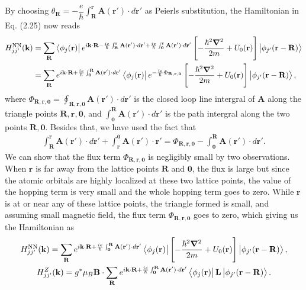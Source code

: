 \documentclass{report}
\newcommand{\f}[2]{\dfrac{#1}{#2}}
\begin{document}
By choosing $\theta_{\mathbf{R}} = - \f{e}{\hbar} \int_{\mathbf{R}}^{\mathbf{r}} \mathbf{A(\mathbf{r'})} \cdot d\mathbf{r'}$ as Peierls substitution, the Hamiltonian in Eq. (2.25) now reads
\begin{equation}
	\begin{aligned}
		H_{jj'}^{\text{NN}}(\mathbf{k})
		 & = \sum_{\mathbf{R}} \bra{\phi_{j}(\mathbf{r})} e^{i\mathbf{k \cdot R} - \frac{ie}{\hbar} \int_{\mathbf{R}}^{\mathbf{r}} \mathbf{A}(\mathbf{r'}) \cdot d\mathbf{r'} + \frac{ie}{\hbar}\int_{\mathbf{0}}^{\mathbf{r}}\mathbf{A(\mathbf{r'})}\cdot d\mathbf{r'} } \left[- \f{\hbar^{2} \boldsymbol{\nabla}^{2}}{2m} + U_{0} (\mathbf{r}) \right] \ket{\phi_{j'}(\mathbf{r - R})} \nonumber \\
		 & = \sum_{\mathbf{R}}  e^{i\mathbf{k \cdot R} + \frac{ie}{\hbar} \int_{\mathbf{0}}^{\mathbf{R}} \mathbf{A(\mathbf{r'})} \cdot d \mathbf{r'} } \bra{\phi_{j}(\mathbf{r})} e^{-\frac{ie}{\hbar} \Phi_{\mathbf{R,r,0}}} \left[ -\f{\hbar^{2} \boldsymbol{\nabla}^{2}}{2m} + U_{0} (\mathbf{r}) \right] \ket{\phi_{j'}(\mathbf{r - R})},
	\end{aligned}
\end{equation}
where $\Phi_{\mathbf{R,r,0}} = \oint_{\mathbf{R,r,0}} \mathbf{A(\mathbf{r'})} \cdot d\mathbf{r'} $ is the closed loop line intergral of $\mathbf{A}$ along the triangle points $\mathbf{R,r,0}$, and $\int_{\mathbf{0}}^{\mathbf{R}} \mathbf{A(\mathbf{r'})} \cdot d \mathbf{r'}$ is the path intergral along the two points $\mathbf{R,0}$. Besides that, we have used the fact that
\begin{align}
	\int_{\mathbf{R}}^{\mathbf{r}} \mathbf{A(\mathbf{r'})} \cdot d\mathbf{r'} + \int_{\mathbf{r}}^{\mathbf{0}} \mathbf{A(r')} \cdot \mathbf{r'} = \Phi_{\mathbf{R,r,0}} - \int_{\mathbf{0}}^{\mathbf{R}} \mathbf{A(\mathbf{r'})} \cdot d \mathbf{r'}.
\end{align}
We can show that the flux term $\Phi_{\mathbf{R,r,0}}$ is negligibly small \cite{yalcin_2019} by two observations. When $\mathbf{r}$ is far away from the lattice points $\mathbf{R}$ and $\mathbf{0}$, the flux is large but since the atomic orbitals are highly localized at these two lattice points, the value of the hopping term is very small and the whole hopping term goes to zero. While $\mathbf{r}$ is at or near any of these lattice points, the triangle formed is small, and assuming small magnetic field, the flux term $\Phi_{\mathbf{R,r,0}}$ goes to zero, which giving us the Hamiltonian as
\begin{gather}
	H_{jj'}^{\text{NN}}(\mathbf{k})
	= \sum_{\mathbf{R}} e^{i\mathbf{k \cdot R} + \frac{ie}{\hbar} \int_{\mathbf{0}}^{\mathbf{R}} \mathbf{A(\mathbf{r'})} \cdot d \mathbf{r'} } \bra{\phi_{j}(\mathbf{r})} \left[ -\f{\hbar^{2} \boldsymbol{\nabla}^{2}}{2m} + U_{0} (\mathbf{r}) \right] \ket{\phi_{j'}(\mathbf{r - R})},\\
	H_{jj'}^{Z}(\mathbf{k})
	= g^{*} \mu_{B} \mathbf{B} \cdot \sum_{\mathbf{R}} e^{i\mathbf{k \cdot R} + \frac{ie}{\hbar} \int_{\mathbf{0}}^{\mathbf{R}} \mathbf{A(\mathbf{r'})} \cdot d\mathbf{r'} } \bra{\phi_{j}(\mathbf{r})} \mathbf{L} \ket{\phi_{j'}(\mathbf{r - R})}.
\end{gather}
\end{document}

